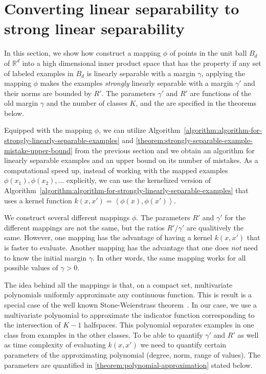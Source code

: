 \documentclass[12pt]{article}
\newcommand{\R}{\mathbb{R}}  %
\newcommand{\ip}[2]{\left\langle #1, #2 \right\rangle} %
\begin{document}
\section{Converting linear separability to strong linear separability}
\label{section:converting-linear-separability-to-strong-linear-separability}

In this section, we show how construct a mapping $\phi$ of points in the unit
ball $B_d$ of $\R^d$ into a high dimensional inner product space that has the
property if any set of labeled examples in $B_d$ is linearly separable with a
margin $\gamma$, applying the mapping $\phi$ makes the examples \emph{strongly}
linearly separable with a margin $\gamma'$ and their norms are bounded by $R'$.
The parameters $\gamma'$ and $R'$ are functions of the old margin $\gamma$ and
the number of classes $K$, and the are specified in the theorems below.

Equipped with the mapping $\phi$, we can utilize
Algorithm~\ref{algorithm:algorithm-for-strongly-linearly-separable-examples} and
\autoref{theorem:strongly-separable-example-mistake-upper-bound} from the
previous section and we obtain an algorithm for linearly separable examples and
an upper bound on its number of mistakes. As a computational speed up, instead
of working with the mapped examples $\phi(x_1), \phi(x_2), \dots$ explicitly, we
can use the kernelized version of
Algorithm~\ref{algorithm:algorithm-for-strongly-linearly-separable-examples}
that uses a kernel function $k(x,x') = \ip{\phi(x)}{\phi(x')}$.

We construct several different mappings $\phi$. The parameters $R'$ and
$\gamma'$ for the different mappings are not the same, but the ratios
$R'/\gamma'$ are qualitively the same. However, one mapping has the advantage of
having a kernel $k(x,x')$ that is faster to evaluate. Another mapping has the
advantage that one does \emph{not} need to know the initial margin $\gamma$. In
other words, the same mapping works for all possible values of $\gamma > 0$.

The idea behind all the mappings is that, on a compact set, multivariate
polynomials uniformly approximate any continuous function. This is result is a
special case of the well known Stone-Weierstrass theorem~\citep[Section
10.10]{Davidson-Donsig-2010}. In our case, we use a multivariate polynomial to
approximate the indicator function corresponding to the intersection of $K-1$
halfspaces. This polynomial separates examples in one class from examples in the
other classes. To be able to quantify $\gamma'$ and $R'$ as well as time
complexity of evaluating $k(x,x')$ we need to quantify certain parameters
of the approximating polynomial (degree, norm, range of values).
The parameters are quantified in \autoref{theorem:polynomial-approximation}
stated below.
\end{document}
